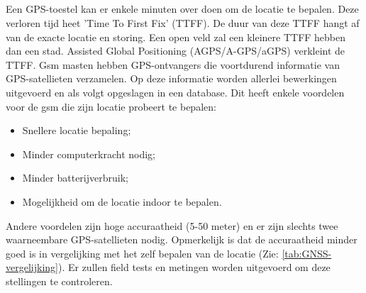 \subsection{}
Een GPS-toestel kan er enkele minuten over doen om de locatie te bepalen. Deze verloren tijd heet 'Time To First Fix' (TTFF). De duur van deze TTFF hangt af van de exacte locatie en storing. Een open veld zal een kleinere TTFF hebben dan een stad. Assisted Global Positioning (AGPS/A-GPS/aGPS) verkleint de TTFF. 
\newline
Gsm masten hebben GPS-ontvangers die voortdurend informatie van GPS-satellieten verzamelen. Op deze informatie worden allerlei bewerkingen uitgevoerd en als volgt opgeslagen in een database. Dit heeft enkele voordelen voor de gsm die zijn locatie probeert te bepalen:
\begin{itemize}
	\item Snellere locatie bepaling;
	\item Minder computerkracht nodig;
	\item Minder batterijverbruik;
	\item Mogelijkheid om de locatie indoor te bepalen.
\end{itemize} 
Andere voordelen zijn hoge accuraatheid (5-50 meter) en er zijn slechts twee waarneembare GPS-satellieten nodig.
Opmerkelijk is dat de accuraatheid minder goed is in vergelijking met het zelf bepalen van de locatie (Zie: \ref{tab:GNSS-vergelijking}). Er zullen field tests en metingen worden uitgevoerd om deze stellingen te controleren. \autocite{agps}

